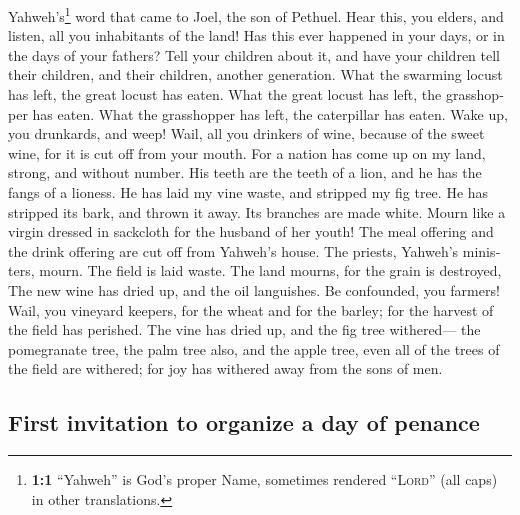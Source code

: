 \begin{paracol}{2}
\begin{otherlanguage}{english}
 Yahweh's\footnote{\textbf{1:1} ``Yahweh'' is God's proper
  Name, sometimes rendered ``\textsc{Lord}'' (all caps) in other
  translations.} word that came to Joel, the son of Pethuel.
 Hear this, you elders, and listen, all you inhabitants of
the land! Has this ever happened in your days, or in the days of your
fathers?  Tell your children about it, and have your
children tell their children, and their children, another generation.
 What the swarming locust has left, the great locust has
eaten. What the great locust has left, the grasshopper has eaten. What
the grasshopper has left, the caterpillar has eaten.  Wake
up, you drunkards, and weep! Wail, all you drinkers of wine, because of
the sweet wine, for it is cut off from your mouth.  For a
nation has come up on my land, strong, and without number. His teeth are
the teeth of a lion, and he has the fangs of a lioness. 
He has laid my vine waste, and stripped my fig tree. He has stripped its
bark, and thrown it away. Its branches are made white. 
Mourn like a virgin dressed in sackcloth for the husband of her youth!
 The meal offering and the drink offering are cut off from
Yahweh's house. The priests, Yahweh's ministers, mourn. 
The field is laid waste. The land mourns, for the grain is destroyed,
The new wine has dried up, and the oil languishes.  Be
confounded, you farmers! Wail, you vineyard keepers, for the wheat and
for the barley; for the harvest of the field has perished.
 The vine has dried up, and the fig tree withered--- the
pomegranate tree, the palm tree also, and the apple tree, even all of
the trees of the field are withered; for joy has withered away from the
sons of men.

\hypertarget{first-invitation-to-organize-a-day-of-penance}{%
\subsection{First invitation to organize a day of
penance}\label{first-invitation-to-organize-a-day-of-penance}}


\end{otherlanguage}
\end{paracol}
